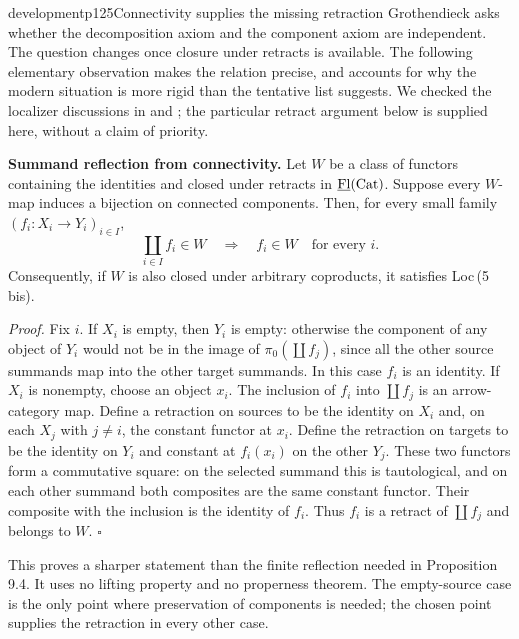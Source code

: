 \begin{dcomment}{development}{p125}{Connectivity supplies the missing retraction}
Grothendieck asks whether the decomposition axiom and the component axiom are independent. The question changes once closure under retracts is available. The following elementary observation makes the relation precise, and accounts for why the modern situation is more rigid than the tentative list suggests. We checked the localizer discussions in \citet[\S2.1 and \S2.4]{Maltsiniotis2020} and \citet[\S9.3]{Cisinski2006}; the particular retract argument below is supplied here, without a claim of priority.

\textbf{Summand reflection from connectivity.}\ours
Let $W$ be a class of functors containing the identities and closed under retracts in $\underline{\mathrm{Fl}}(\mathrm{Cat})$. Suppose every $W$-map induces a bijection on connected components. Then, for every small family $(f_i:X_i\longrightarrow Y_i)_{i\in I}$,
\[
 \coprod_{i\in I}f_i\in W\quad\Longrightarrow\quad f_i\in W
 \quad\text{for every }i.
\]
Consequently, if $W$ is also closed under arbitrary coproducts, it satisfies Loc\,(5\,bis).

\emph{Proof.} Fix $i$. If $X_i$ is empty, then $Y_i$ is empty: otherwise the component of any object of $Y_i$ would not be in the image of $\pi_0(\coprod f_j)$, since all the other source summands map into the other target summands. In this case $f_i$ is an identity. If $X_i$ is nonempty, choose an object $x_i$. The inclusion of $f_i$ into $\coprod f_j$ is an arrow-category map. Define a retraction on sources to be the identity on $X_i$ and, on each $X_j$ with $j\ne i$, the constant functor at $x_i$. Define the retraction on targets to be the identity on $Y_i$ and constant at $f_i(x_i)$ on the other $Y_j$. These two functors form a commutative square: on the selected summand this is tautological, and on each other summand both composites are the same constant functor. Their composite with the inclusion is the identity of $f_i$. Thus $f_i$ is a retract of $\coprod f_j$ and belongs to $W$. \hfill$\square$

This proves a sharper statement than the finite reflection needed in Proposition 9.4. It uses no lifting property and no properness theorem. The empty-source case is the only point where preservation of components is needed; the chosen point supplies the retraction in every other case.


\end{dcomment}
